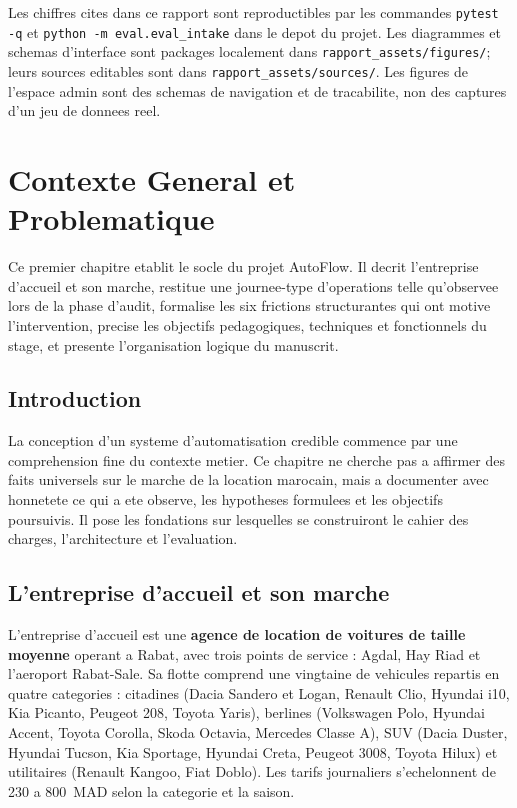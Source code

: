 \documentclass[12pt,a4paper,openany]{report}
\begin{document}
\vspace{0.3cm}
\begin{infobox}
Les chiffres cites dans ce rapport sont reproductibles par les commandes \texttt{pytest -q} et \texttt{python -m eval.eval\_intake} dans le depot du projet. Les diagrammes et schemas d'interface sont packages localement dans \texttt{rapport\_assets/figures/}; leurs sources editables sont dans \texttt{rapport\_assets/sources/}. Les figures de l'espace admin sont des schemas de navigation et de tracabilite, non des captures d'un jeu de donnees reel.
\end{infobox}

\chapter{Contexte General et Problematique}\label{chap:contexte}
Ce premier chapitre etablit le socle du projet AutoFlow. Il decrit l'entreprise d'accueil et son marche, restitue une journee-type d'operations telle qu'observee lors de la phase d'audit, formalise les six frictions structurantes qui ont motive l'intervention, precise les objectifs pedagogiques, techniques et fonctionnels du stage, et presente l'organisation logique du manuscrit.

\section{Introduction}
La conception d'un systeme d'automatisation credible commence par une comprehension fine du contexte metier. Ce chapitre ne cherche pas a affirmer des faits universels sur le marche de la location marocain, mais a documenter avec honnetete ce qui a ete observe, les hypotheses formulees et les objectifs poursuivis. Il pose les fondations sur lesquelles se construiront le cahier des charges, l'architecture et l'evaluation.

\section{L'entreprise d'accueil et son marche}

L'entreprise d'accueil est une \textbf{agence de location de voitures de taille moyenne} operant a Rabat, avec trois points de service : Agdal, Hay Riad et l'aeroport Rabat-Sale. Sa flotte comprend une vingtaine de vehicules repartis en quatre categories : citadines (Dacia Sandero et Logan, Renault Clio, Hyundai i10, Kia Picanto, Peugeot 208, Toyota Yaris), berlines (Volkswagen Polo, Hyundai Accent, Toyota Corolla, Skoda Octavia, Mercedes Classe A), SUV (Dacia Duster, Hyundai Tucson, Kia Sportage, Hyundai Creta, Peugeot 3008, Toyota Hilux) et utilitaires (Renault Kangoo, Fiat Doblo). Les tarifs journaliers s'echelonnent de 230 a 800~MAD selon la categorie et la saison.
\end{document}
